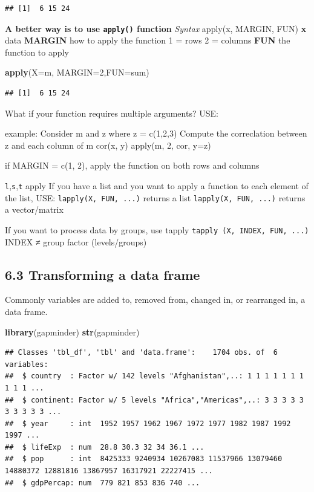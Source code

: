 \documentclass[]{article}
\newenvironment{Shaded}{\begin{snugshade}}{\end{snugshade}}
\newcommand{\KeywordTok}[1]{\textcolor[rgb]{0.13,0.29,0.53}{\textbf{#1}}}
\newcommand{\DataTypeTok}[1]{\textcolor[rgb]{0.13,0.29,0.53}{#1}}
\newcommand{\DecValTok}[1]{\textcolor[rgb]{0.00,0.00,0.81}{#1}}
\newcommand{\NormalTok}[1]{#1}
\begin{document}
\begin{verbatim}
## [1]  6 15 24
\end{verbatim}

\textbf{A better way is to use \texttt{apply()} function} \emph{Syntax}
apply(x, MARGIN, FUN) \textbf{x} data \textbf{MARGIN} how to apply the
function 1 = rows 2 = columns \textbf{FUN} the function to apply

\begin{Shaded}
\begin{Highlighting}[]
\KeywordTok{apply}\NormalTok{(}\DataTypeTok{X=}\NormalTok{m, }\DataTypeTok{MARGIN=}\DecValTok{2}\NormalTok{,}\DataTypeTok{FUN=}\NormalTok{sum)}
\end{Highlighting}
\end{Shaded}

\begin{verbatim}
## [1]  6 15 24
\end{verbatim}

What if your function requires multiple arguments? USE:

example: Consider m and z where z = c(1,2,3) Compute the correclation
between z and each column of m cor(x, y) apply(m, 2, cor, y=z)

if MARGIN = c(1, 2), apply the function on both rows and columns

\texttt{l},\texttt{s},\texttt{t} apply If you have a list and you want
to apply a function to each element of the list, USE:
\texttt{lapply(X,\ FUN,\ ...)} returns a list
\texttt{lapply(X,\ FUN,\ ...)} returns a vector/matrix

If you want to process data by groups, use tapply
\texttt{tapply\ (X,\ INDEX,\ FUN,\ ...)} INDEX ≠ group factor
(levels/groups)

\subsection{6.3 Transforming a data
frame}\label{transforming-a-data-frame}

Commonly variables are added to, removed from, changed in, or rearranged
in, a data frame.

\begin{Shaded}
\begin{Highlighting}[]
\KeywordTok{library}\NormalTok{(gapminder)}
\KeywordTok{str}\NormalTok{(gapminder)}
\end{Highlighting}
\end{Shaded}

\begin{verbatim}
## Classes 'tbl_df', 'tbl' and 'data.frame':    1704 obs. of  6 variables:
##  $ country  : Factor w/ 142 levels "Afghanistan",..: 1 1 1 1 1 1 1 1 1 1 ...
##  $ continent: Factor w/ 5 levels "Africa","Americas",..: 3 3 3 3 3 3 3 3 3 3 ...
##  $ year     : int  1952 1957 1962 1967 1972 1977 1982 1987 1992 1997 ...
##  $ lifeExp  : num  28.8 30.3 32 34 36.1 ...
##  $ pop      : int  8425333 9240934 10267083 11537966 13079460 14880372 12881816 13867957 16317921 22227415 ...
##  $ gdpPercap: num  779 821 853 836 740 ...
\end{verbatim}
\end{document}
